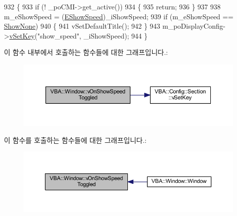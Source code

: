\begin{DoxyCode}
932 \{
933   \textcolor{keywordflow}{if} (! \_poCMI->get\_active())
934   \{
935     \textcolor{keywordflow}{return};
936   \}
937 
938   m\_eShowSpeed = (\mbox{\hyperlink{class_v_b_a_1_1_window_a9dfcf6d1a23c7576d357221d4bedda45}{EShowSpeed}})\_iShowSpeed;
939   \textcolor{keywordflow}{if} (m\_eShowSpeed == \mbox{\hyperlink{class_v_b_a_1_1_window_a9dfcf6d1a23c7576d357221d4bedda45af272aa72487b69bcd8b10a1e257c9b6d}{ShowNone}})
940   \{
941     vSetDefaultTitle();
942   \}
943   m\_poDisplayConfig->\mbox{\hyperlink{class_v_b_a_1_1_config_1_1_section_a57e1b95cbea40db71c093381beff4b0e}{vSetKey}}(\textcolor{stringliteral}{"show\_speed"}, \_iShowSpeed);
944 \}
\end{DoxyCode}
이 함수 내부에서 호출하는 함수들에 대한 그래프입니다.\+:
\nopagebreak
\begin{figure}[H]
\begin{center}
\leavevmode
\includegraphics[width=350pt]{class_v_b_a_1_1_window_a81a46aa6f68c512ed86aa04ca13dbd71_cgraph}
\end{center}
\end{figure}
이 함수를 호출하는 함수들에 대한 그래프입니다.\+:
\nopagebreak
\begin{figure}[H]
\begin{center}
\leavevmode
\includegraphics[width=350pt]{class_v_b_a_1_1_window_a81a46aa6f68c512ed86aa04ca13dbd71_icgraph}
\end{center}
\end{figure}
\mbox{\label{class_v_b_a_1_1_window_aa64899ec70d7a82ab4eee24567585f3b}} 
